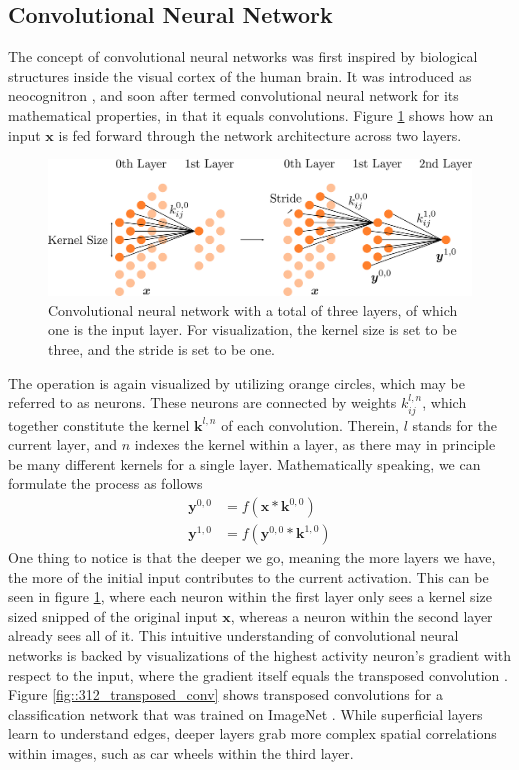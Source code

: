 \subsection{Convolutional Neural Network}
The concept of convolutional neural networks was first inspired by biological structures inside the visual cortex of the human brain. It was introduced as neocognitron \cite{fukushima1980neocognitron}, and soon after termed convolutional neural network for its mathematical properties, in that it equals convolutions. Figure \ref{fig::312_convolutional} shows how an input $\bm{x}$ is fed forward through the network architecture across two layers.   
\begin{figure}[h!]
	\centering
	\includegraphics[scale=.28]{chapters/04_principles_of_machine_learning/img/convolutional.png}
	\caption{Convolutional neural network with a total of three layers, of which one is the input layer. For visualization, the kernel size is set to be three, and the stride is set to be one.}
	\label{fig::312_convolutional}
\end{figure}
The operation is again visualized by utilizing orange circles, which may be referred to as neurons. These neurons are connected by weights $k^{l,n}_{ij}$, which together constitute the kernel $\bm{k}^{l,n}$ of each convolution. Therein, $l$ stands for the current layer, and $n$ indexes the kernel within a layer, as there may in principle be many different kernels for a single layer. Mathematically speaking, we can formulate the process as follows
\begin{align}
	\bm{y}^{0,0} &= f(\bm{x}*\bm{k}^{0,0}) \\
	\bm{y}^{1,0} &= f(\bm{y}^{0,0}*\bm{k}^{1,0})	
\end{align}
One thing to notice is that the deeper we go, meaning the more layers we have, the more of the initial input contributes to the current activation. This can be seen in figure \ref{fig::312_convolutional}, where each neuron within the first layer only sees a kernel size sized snipped of the original input $\bm{x}$, whereas a neuron within the second layer already sees all of it. This intuitive understanding of convolutional neural networks is backed by visualizations of the highest activity neuron's gradient with respect to the input, where the gradient itself equals the transposed convolution \cite{simonyan2013deep}.  Figure \ref{fig::312_transposed_conv} shows transposed convolutions for a classification network that was trained on ImageNet \cite{deng2009imagenet}. While superficial layers learn to understand edges, deeper layers grab more complex spatial correlations within images, such as car wheels within the third layer.
